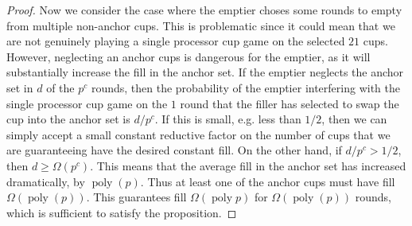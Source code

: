 \documentclass{article}[11pt]
\DeclareMathOperator{\poly}{\text{poly}}
\begin{document}
\begin{proof}
  Now we consider the case where the emptier choses some rounds to empty from
  multiple non-anchor cups. This is problematic since it could mean that we
  are not genuinely playing a single processor cup game on the selected $21$ cups.
  However, neglecting an anchor cups is dangerous for the emptier, as it will
  substantially increase the fill in the anchor set. If the emptier neglects
  the anchor set in $d$ of the $p^c$ rounds, then the probability of the
  emptier interfering with the single processor cup game on the $1$ round that
  the filler has selected to swap the cup into the anchor set is $d/p^c$. If
  this is small, e.g. less than $1/2$, then we can simply accept a small
  constant reductive factor on the number of cups that we are guaranteeing have
  the desired constant fill. On the other hand, if $d/p^c > 1/2$, then $d \ge \Omega(p^c)$. 
  This means that the average fill in the anchor set has increased dramatically, by $\poly(p)$.
  Thus at least one of the anchor cups must have fill $\Omega(\poly(p))$. This
  guarantees fill $\Omega(\poly p)$ for $\Omega(\poly(p))$ rounds, which is
  sufficient to satisfy the proposition.

\end{proof}
\end{document}
